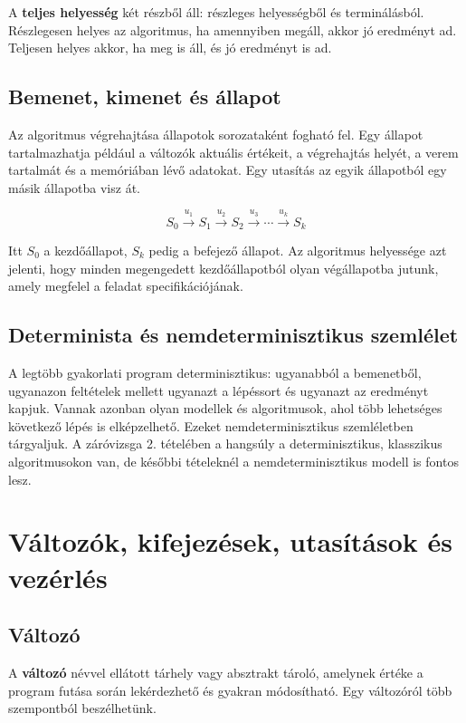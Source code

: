 A \textbf{teljes helyesség} két részből áll: részleges helyességből és terminálásból. Részlegesen helyes az algoritmus, ha amennyiben megáll, akkor jó eredményt ad. Teljesen helyes akkor, ha meg is áll, és jó eredményt is ad.

\subsection{Bemenet, kimenet és állapot}

Az algoritmus végrehajtása állapotok sorozataként fogható fel. Egy állapot tartalmazhatja például a változók aktuális értékeit, a végrehajtás helyét, a verem tartalmát és a memóriában lévő adatokat. Egy utasítás az egyik állapotból egy másik állapotba visz át.

\[
S_0 \xrightarrow{u_1} S_1 \xrightarrow{u_2} S_2 \xrightarrow{u_3} \cdots \xrightarrow{u_k} S_k
\]

Itt $S_0$ a kezdőállapot, $S_k$ pedig a befejező állapot. Az algoritmus helyessége azt jelenti, hogy minden megengedett kezdőállapotból olyan végállapotba jutunk, amely megfelel a feladat specifikációjának.

\subsection{Determinista és nemdeterminisztikus szemlélet}

A legtöbb gyakorlati program determinisztikus: ugyanabból a bemenetből, ugyanazon feltételek mellett ugyanazt a lépéssort és ugyanazt az eredményt kapjuk. Vannak azonban olyan modellek és algoritmusok, ahol több lehetséges következő lépés is elképzelhető. Ezeket nemdeterminisztikus szemléletben tárgyaljuk. A záróvizsga 2. tételében a hangsúly a determinisztikus, klasszikus algoritmusokon van, de későbbi tételeknél a nemdeterminisztikus modell is fontos lesz.

\section{Változók, kifejezések, utasítások és vezérlés}

\subsection{Változó}

A \textbf{változó} névvel ellátott tárhely vagy absztrakt tároló, amelynek értéke a program futása során lekérdezhető és gyakran módosítható. Egy változóról több szempontból beszélhetünk.

